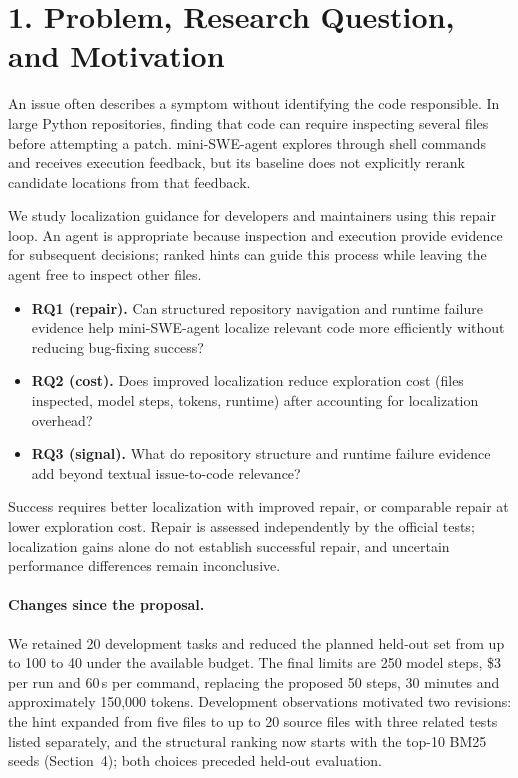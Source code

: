 \section*{1. Problem, Research Question, and Motivation}

An issue often describes a symptom without identifying the code responsible. In large Python
repositories, finding that code can require inspecting several files before attempting a patch.
mini-SWE-agent explores through shell commands and receives execution feedback, but its baseline
does not explicitly rerank candidate locations from that feedback.

We study localization guidance for developers and maintainers using this repair loop. An agent
is appropriate because inspection and execution provide evidence for subsequent decisions;
ranked hints can guide this process while leaving the agent free to inspect other files.

\begin{itemize}[leftmargin=*,itemsep=0.1em,topsep=0.2em]
  \item \textbf{RQ1 (repair).} Can structured repository navigation and runtime failure evidence
        help mini-SWE-agent localize relevant code more efficiently without reducing bug-fixing success?
  \item \textbf{RQ2 (cost).} Does improved localization reduce exploration cost (files inspected,
        model steps, tokens, runtime) after accounting for localization overhead?
  \item \textbf{RQ3 (signal).} What do repository structure and runtime failure evidence add
        beyond textual issue-to-code relevance?
\end{itemize}

Success requires better localization with improved repair, or comparable repair at lower
exploration cost. Repair is assessed independently by the official tests; localization gains
alone do not establish successful repair, and uncertain performance differences remain inconclusive.

\paragraph{Changes since the proposal.}
We retained 20 development tasks and reduced the planned held-out set from up to 100 to 40
under the available budget. The final limits are 250 model steps, \$3 per run and 60\,s per command,
replacing the proposed 50 steps, 30 minutes and approximately 150,000 tokens.
Development observations motivated two revisions: the hint expanded from five files to up to
20 source files with three related tests listed separately, and the structural ranking now
starts with the top-10 BM25 seeds (Section~4); both choices preceded held-out evaluation.
